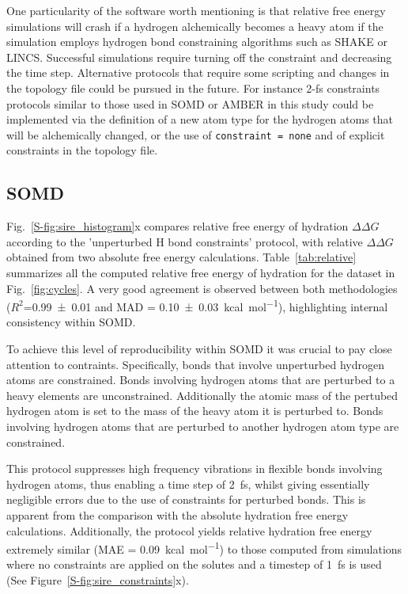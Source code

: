 \documentclass[journal=jctcce,manuscript=article]{achemso}
\newcommand{\inpopt}[1]{\texttt{#1}}
\begin{document}
One particularity of the software worth mentioning is that relative free energy 
simulations will crash if a hydrogen alchemically becomes a heavy atom if the 
simulation employs hydrogen bond constraining algorithms such as SHAKE or LINCS.
Successful simulations require turning off the constraint and decreasing 
the time step. Alternative protocols that require some scripting and 
changes in the topology file could be pursued in the future. For instance 2-fs constraints protocols similar to those used in SOMD or AMBER in this study could be implemented via the definition of a new atom type for the hydrogen atoms that will be alchemically changed, or the use of \inpopt{constraint = none} and of explicit constraints in the topology file.

\subsection{SOMD}
\label{sec:somd-results}

Fig.~\ref{S-fig:sire_histogram}x compares relative free energy of hydration 
$\Delta\Delta G$ according to the 'unperturbed H bond constraints' protocol, with relative 
$\Delta \Delta G$ obtained from two absolute free energy calculations. 
Table~\ref{tab:relative} summarizes all the computed relative free energy of 
hydration for the dataset in Fig.~\ref{fig:cycles}.
A very good agreement is observed between both methodologies 
($R^2$=\SI{0.99+-0.01}{} and MAD = \SI{0.10+-0.03}{kcal.mol^{-1}}), 
highlighting internal consistency within SOMD.

To achieve this level of reproducibility within SOMD it was crucial to pay close
attention to contraints. Specifically, bonds that involve unperturbed 
hydrogen atoms are constrained. Bonds involving hydrogen atoms that are 
perturbed to a heavy elements are unconstrained.  Additionally the atomic mass 
of the pertubed hydrogen atom is set to the mass of the heavy atom it is 
perturbed to.  Bonds involving hydrogen atoms that are perturbed to another 
hydrogen atom type are constrained. 

This protocol suppresses high frequency vibrations in flexible bonds involving 
hydrogen atoms, thus enabling a time 
step of \SI{2}{fs}, whilst giving essentially negligible errors due to the use 
of constraints for perturbed bonds.  This is apparent from the comparison with 
the absolute hydration free energy calculations.  Additionally, the protocol 
yields relative hydration free energy extremely similar  (MAE = 
\SI{0.09}{kcal.mol^{-1}}) to those computed from simulations where no
constraints are applied on the solutes and a timestep of \SI{1}{fs} is
used (See Figure~\ref{S-fig:sire_constraints}x).
\end{document}
